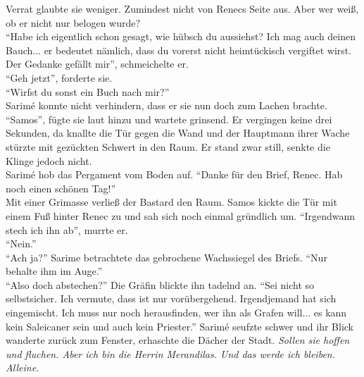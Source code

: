 Verrat glaubte sie weniger. Zumindest nicht von Renecs Seite aus. Aber wer weiß, ob er nicht nur 
belogen wurde?\\
``Habe ich eigentlich schon gesagt, wie hübsch du aussiehst? Ich mag auch deinen Bauch... er 
bedeutet nämlich, dass du vorerst nicht heimtückisch vergiftet wirst. Der Gedanke gefällt mir'', 
schmeichelte er.\\
``Geh jetzt'', forderte sie.\\
``Wirfst du sonst ein Buch nach mir?''\\
Sarimé konnte nicht verhindern, dass er sie nun doch zum Lachen brachte. ``Samos'', fügte sie laut 
hinzu und wartete grinsend. Er vergingen keine drei Sekunden, da knallte die Tür gegen die Wand und 
der Hauptmann ihrer Wache stürzte mit gezückten Schwert in den Raum. Er stand zwar still, senkte die 
Klinge jedoch nicht.\\
Sarimé hob das Pergament vom Boden auf. ``Danke für den Brief, Renec. Hab noch einen schönen 
Tag!''\\
Mit einer Grimasse verließ der Bastard den Raum. Samos kickte die Tür mit einem Fuß hinter Renec zu 
und sah sich noch einmal gründlich um. 
``Irgendwann stech ich ihn ab'', murrte er.\\
``Nein.''\\
``Ach ja?''
Sarime betrachtete das gebrochene Wachssiegel des Briefs. ``Nur behalte ihm im Auge.''\\
``Also doch abstechen?''
Die Gräfin blickte ihn tadelnd an. ``Sei nicht so selbstsicher. Ich vermute, dass ist nur 
vorübergehend. Irgendjemand hat sich eingemischt.  Ich muss nur noch herausfinden, wer ihn als 
Grafen will... es kann kein Saleicaner sein und auch kein Priester.'' Sarimé seufzte schwer und ihr 
Blick wanderte zurück zum Fenster, erhaschte die Dächer der Stadt. \textit{Sollen sie hoffen und 
fluchen. Aber ich bin die Herrin Merandilas. Und das werde ich bleiben. Alleine.}

